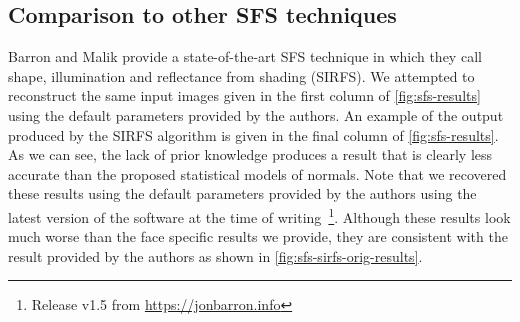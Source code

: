 \subsection{Comparison to other SFS techniques}\label{subsec:sfs-compare}
Barron and Malik provide a state-of-the-art SFS technique in
\cite{barron2015shape} which they call shape, illumination and
reflectance from shading (SIRFS). We attempted to reconstruct the same input
images given in the first column of \cref{fig:sfs-results} using the
default parameters provided by the authors. An example of the output produced
by the SIRFS algorithm is given in the final column of \cref{fig:sfs-results}.
As we can see, the lack of prior knowledge produces a result that is clearly
less accurate than the proposed statistical models of normals. Note that we
recovered these results using the default parameters provided by the authors
using the latest version of the software at the time of
writing~\footnote{Release v1.5 from \url{https://jonbarron.info}}. Although
these results look much worse than the face specific results we provide,
they are consistent with the result provided by the authors as shown
in \cref{fig:sfs-sirfs-orig-results}.
